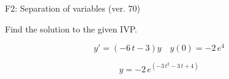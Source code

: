 \begin{exercise}
  \begin{exerciseTitle}F2: Separation of variables (ver. 70)\end{exerciseTitle}
  \begin{exerciseStatement}
    
Find the solution to the given IVP.

    
\[y'=( -6 \, t - 3 )y\hspace{1em} y(0)= -2 \, e^{4}\]

  \end{exerciseStatement}
  \begin{exerciseAnswer}
    
\[y= -2 \, e^{\left(-3 \, t^{2} - 3 \, t + 4\right)}\]

  \end{exerciseAnswer}
\end{exercise}